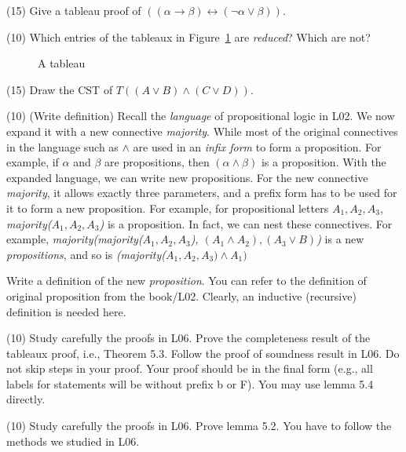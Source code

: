 \documentclass[12pt, letterpaper]{article}
\begin{document}
{\item (15) Give a tableau proof of  $((\alpha \rightarrow \beta) \leftrightarrow (\neg \alpha \vee
\beta))$.


\item (10) Which entries of the tableaux in Figure~\ref{tab3} are {\em reduced}? Which
are not?

\begin{figure}[htb]
\begin{center}

\end{center}
\caption{A tableau} 
\label{tab3}
\end{figure}


\item (15) Draw the CST of $T((A \lor B) \land (C \lor D))$.

\item  (10) (Write definition)  
Recall the {\em language} of propositional logic in L02. We now expand it with a new connective {\em majority}. While most of the original connectives in the language such as $\land$ are used in an {\em infix form} to form a proposition. For example, if $\alpha$ and $\beta$ are propositions, then $(\alpha \land \beta)$ is a proposition. With the expanded language, we can write new propositions.  For the new connective {\em majority}, it allows exactly three parameters, and  a prefix form has to be used for it to form a new proposition. For example, for propositional letters $A_1,   A_2,  A_3$, 
 {\em majority($A_1,   A_2,  A_3$)}  is a proposition. In fact, we can nest these connectives. For example, 
 {\em majority(majority($A_1, A_2, A_3$), $(A_1
\land A_2), (A_3 \lor B)$)} is a new  {\em propositions}, and so is 
{\em (majority($A_1,   A_2,  A_3) \land A_1)$} 

Write a definition of the new {\em proposition}. You can refer to the definition of original proposition from the book/L02. Clearly, an inductive (recursive) definition is needed here. 

\item (10) Study carefully the proofs in L06. Prove the completeness result of the tableaux proof, i.e., Theorem 5.3. Follow the proof of soundness result in L06. Do not skip steps in your proof. 
Your proof should be in the final form (e.g., all labels for statements will be without prefix b or F). You may use lemma 5.4 directly.

\item (10) Study carefully the proofs  in L06. Prove lemma 5.2. You have to follow the methods we studied in L06. 
}
\end{document}
